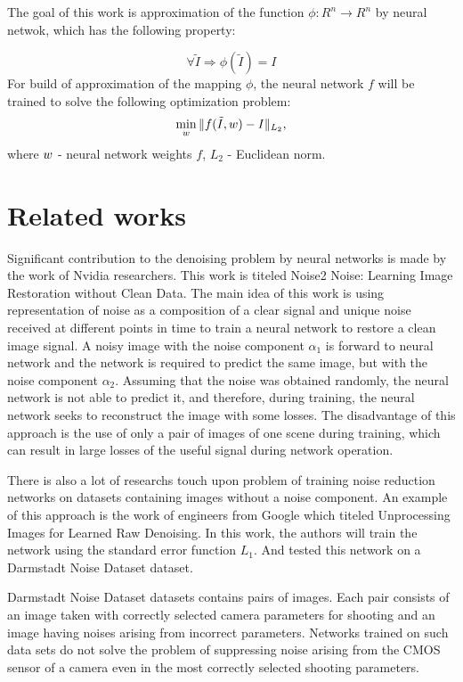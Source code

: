 \documentclass[runningheads]{llncs}
\begin{document}
The goal of this work is approximation of the function $\phi: \mathit{R}^n \longrightarrow  \mathit{R}^n$ by neural netwok, which has the following property:

\begin{equation}\label{eq:main_property}
\forall \tilde{I} \Longrightarrow \phi(\tilde{I}) = I 
\end{equation}
For build of approximation of the mapping $\phi$, the neural network $f$ will be trained to solve the following optimization problem:
\begin{eqnarray}\label{eq:main_min_task}
\min_{\mathnormal{w}} \Arrowvert f(\tilde{I}, \mathnormal{w}) - I \Arrowvert_{L_2}\mathit{ ,}
\end{eqnarray}
where $\mathnormal{w}$ - neural network weights $f$, $L_2$ - Euclidean norm.


\section{Related works}
Significant contribution to the denoising problem by neural networks is made by the work of Nvidia researchers. This work is titeled Noise2 Noise: Learning Image Restoration without Clean Data. The main idea of this work is using representation of noise as a composition of a clear signal and unique noise received at different points in time to train a neural network to restore a clean image signal. A noisy image with the noise component $\alpha_1$ is forward to neural network and the network is required to predict the same image, but with the noise component $\alpha_2$. Assuming that the noise was obtained randomly, the neural network is not able to predict it, and therefore, during training, the neural network seeks to reconstruct the image with some losses. The disadvantage of this approach is the use of only a pair of images of one scene during training, which can result in large losses of the useful signal during network operation.

There is also a lot of researchs touch upon problem of training noise reduction networks on datasets containing images without a noise component. An example of this approach is the work of engineers from Google which titeled Unprocessing Images for Learned Raw Denoising. In this work, the authors will train the network using the standard error function $L_1$. And tested this network on a Darmstadt Noise Dataset dataset.

Darmstadt Noise Dataset datasets contains pairs of images. Each pair consists of an image taken with correctly selected camera parameters for shooting and an image having noises arising from incorrect parameters. Networks trained on such data sets do not solve the problem of suppressing noise arising from the CMOS sensor of a camera even in the most correctly selected shooting parameters.
\end{document}
